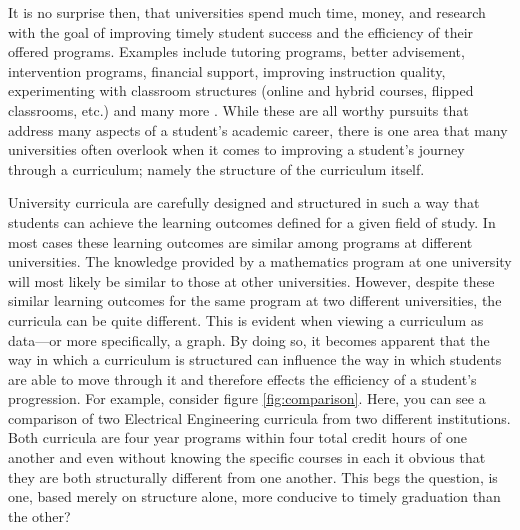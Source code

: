 \documentclass[botnum, fleqn]{unmeethesis}
\begin{document}
  It is no surprise then, that universities spend much time, money, and research with the goal of improving timely student success and the efficiency of their offered programs. Examples include tutoring programs, better advisement, intervention programs, financial support, improving instruction quality, experimenting with classroom structures (online and hybrid courses, flipped classrooms, etc.) and many more \cite{o2015use,topping1996effectiveness,hunter2004could,king2002identifying,lewallen1993early}. While these are all worthy pursuits that address many aspects of a student's academic career, there is one area that many universities often overlook when it comes to improving a student's journey through a curriculum; namely the structure of the curriculum itself.

  University curricula are carefully designed and structured in such a way that students can achieve the learning outcomes defined for a given field of study. In most cases these learning outcomes are similar among programs at different universities. The knowledge provided by a mathematics program at one university will most likely be similar to those at other universities. However, despite these similar learning outcomes for the same program at two different universities, the curricula can be quite different. This is evident when viewing a curriculum as data---or more specifically, a graph. By doing so, it becomes apparent that the way in which a curriculum is structured can influence the way in which students are able to move through it and therefore effects the efficiency of a student's progression. For example, consider figure \ref{fig:comparison}. Here, you can see a comparison of two Electrical Engineering curricula from two different institutions. Both curricula are four year programs within four total credit hours of one another and even without knowing the specific courses in each it obvious that they are both structurally different from one another. This begs the question, is one, based merely on structure alone, more conducive to timely graduation than the other?
\end{document}
